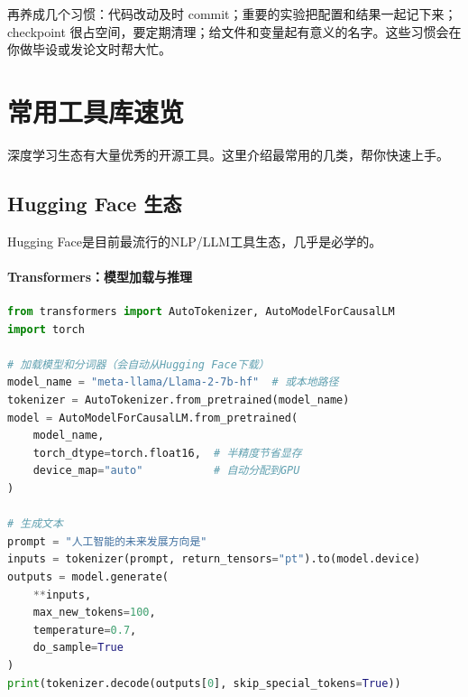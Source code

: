 \begin{remark}
再养成几个习惯：代码改动及时 commit；重要的实验把配置和结果一起记下来；checkpoint 很占空间，要定期清理；给文件和变量起有意义的名字。这些习惯会在你做毕设或发论文时帮大忙。
\end{remark}

\section*{常用工具库速览}

深度学习生态有大量优秀的开源工具。这里介绍最常用的几类，帮你快速上手。

\subsection*{Hugging Face 生态}


Hugging Face是目前最流行的NLP/LLM工具生态，几乎是必学的。

\paragraph{Transformers：模型加载与推理}\mbox{}\par\nopagebreak

\begin{lstlisting}[language=Python, caption=使用Transformers加载和使用模型]
from transformers import AutoTokenizer, AutoModelForCausalLM
import torch

# 加载模型和分词器（会自动从Hugging Face下载）
model_name = "meta-llama/Llama-2-7b-hf"  # 或本地路径
tokenizer = AutoTokenizer.from_pretrained(model_name)
model = AutoModelForCausalLM.from_pretrained(
    model_name,
    torch_dtype=torch.float16,  # 半精度节省显存
    device_map="auto"           # 自动分配到GPU
)

# 生成文本
prompt = "人工智能的未来发展方向是"
inputs = tokenizer(prompt, return_tensors="pt").to(model.device)
outputs = model.generate(
    **inputs,
    max_new_tokens=100,
    temperature=0.7,
    do_sample=True
)
print(tokenizer.decode(outputs[0], skip_special_tokens=True))
\end{lstlisting}

